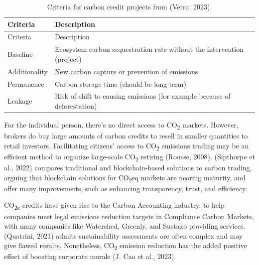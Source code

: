 \documentclass[
  12pt,
  letterpaper,
  DIV=11,
  numbers=noendperiod]{scrartcl}
\begin{document}
\def\pandoctableshortcapt{Criteria for Carbon Credit Projects}

\begin{longtable}[]{@{}
  >{\raggedright\arraybackslash}p{}
  >{\raggedright\arraybackslash}p{}@{}}
\caption[Criteria for Carbon Credit Projects]{Criteria for carbon credit
projects from (Verra, 2023).}\tabularnewline
\toprule\noalign{}
\begin{minipage}[b]{\linewidth}\raggedright
Criteria
\end{minipage} & \begin{minipage}[b]{\linewidth}\raggedright
Description
\end{minipage} \\
\midrule\noalign{}
\endfirsthead
\toprule\noalign{}
\begin{minipage}[b]{\linewidth}\raggedright
Criteria
\end{minipage} & \begin{minipage}[b]{\linewidth}\raggedright
Description
\end{minipage} \\
\midrule\noalign{}
\endhead
\bottomrule\noalign{}
\endlastfoot
Baseline & Ecosystem carbon sequestration rate without the intervention
(project) \\
Additionality & New carbon capture or prevention of emissions \\
Permanence & Carbon storage time (should be long-term) \\
Leakage & Risk of shift to causing emissions (for example because of
deforestation) \\
\end{longtable}

\let\pandoctableshortcapt\relax

For the individual person, there's no direct access to
CO\textsubscript{2} markets. However, brokers do buy large amounts of
carbon credits to resell in smaller quantities to retail investors.
Facilitating citizens' access to CO\textsubscript{2} emissions trading
may be an efficient method to organize large-scale CO\textsubscript{2}
retiring (Rousse, 2008). (Sipthorpe et al., 2022) compares traditional
and blockchain-based solutions to carbon trading, arguing that
blockchain solutions for CO\textsubscript{2}eq markets are nearing
maturity, and offer many improvements, such as enhancing transparency,
trust, and efficiency.

CO\textsubscript{2e} credits have given rise to the Carbon Accounting
industry, to help companies meet legal emissions reduction targets in
Compliance Carbon Markets, with many companies like Watershed, Greenly,
and Sustaxo providing services. (Quatrini, 2021) admits sustainability
assessments are often complex and may give flawed results. Nonetheless,
CO\textsubscript{2} emission reduction has the added positive effect of
boosting corporate morale (J. Cao et al., 2023).
\end{document}
